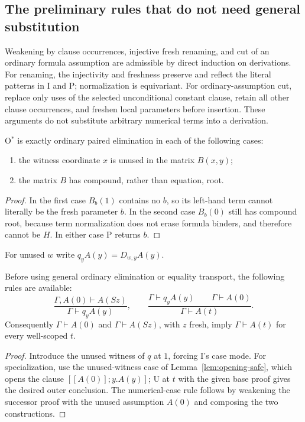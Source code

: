 \subsection{The preliminary rules that do not need general substitution}

Weakening by clause occurrences, injective fresh renaming, and cut of an
ordinary formula assumption are admissible by direct induction on
derivations. For renaming, the injectivity and freshness preserve and
reflect the literal patterns in I and P; normalization is equivariant.
For ordinary-assumption cut, replace only uses of the selected
unconditional constant clause, retain all other clause occurrences, and
freshen local parameters before insertion. These arguments do not
substitute arbitrary numerical terms into a derivation.

\begin{lemma}
\label{lem:opening-safe}
O$^*$ is exactly ordinary paired elimination in each of the following cases:
\begin{enumerate}
 \item the witness coordinate $x$ is unused in the matrix $B(x,y)$;
 \item the matrix $B$ has compound, rather than equation, root.
\end{enumerate}
\end{lemma}
\begin{proof}
In the first case $B_b(1)$ contains no $b$, so its left-hand term cannot
literally be the fresh parameter $b$. In the second case $B_b(0)$ still
has compound root, because term normalization does not erase formula
binders, and therefore cannot be $H$. In either case P returns $b$.
\end{proof}

For unused $w$ write $q_yA(y)=D_{w,y}A(y)$.
\begin{lemma}
\label{lem:opening-cases}
Before using general ordinary elimination or equality transport, the
following rules are available:
\[
 \frac{\Gamma,A(0)\vdash A(Sz)}{\Gamma\vdash q_yA(y)},
 \qquad
 \frac{\Gamma\vdash q_yA(y)\qquad\Gamma\vdash A(0)}
      {\Gamma\vdash A(t)}.
\]
Consequently $\Gamma\vdash A(0)$ and $\Gamma\vdash A(Sz)$, with $z$
fresh, imply $\Gamma\vdash A(t)$ for every well-scoped $t$.
\end{lemma}
\begin{proof}
Introduce the unused witness of $q$ at $1$, forcing I's case mode.
For specialization, use the unused-witness case of
Lemma~\ref{lem:opening-safe}, which opens the clause
$[[A(0)];y.A(y)]$; U at $t$ with the given base proof gives the desired
outer conclusion. The numerical-case rule follows by weakening the
successor proof with the unused assumption $A(0)$ and composing the
two constructions.
\end{proof}

